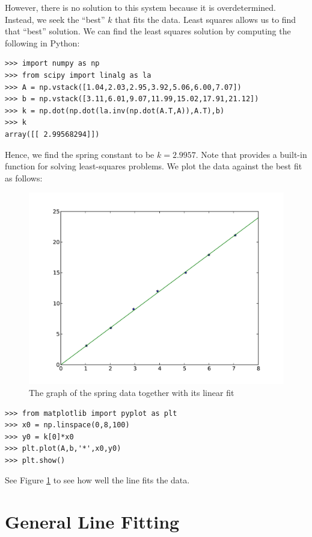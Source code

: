 However, there is no solution to this system because it is overdetermined.  
Instead, we seek the ``best'' $k$ that fits the data.  
Least squares allows us to find that ``best'' solution. 
We can find the least squares solution by computing the following in Python:
\begin{lstlisting}
>>> import numpy as np
>>> from scipy import linalg as la
>>> A = np.vstack([1.04,2.03,2.95,3.92,5.06,6.00,7.07])
>>> b = np.vstack([3.11,6.01,9.07,11.99,15.02,17.91,21.12])
>>> k = np.dot(np.dot(la.inv(np.dot(A.T,A)),A.T),b)
>>> k
array([[ 2.99568294]])
\end{lstlisting}
Hence, we find the spring constant to be $k = 2.9957$.
Note that  provides a built-in function for solving 
least-squares problems.
We plot the data against the best fit as follows:
\begin{figure}[h!]
\label{fig1}
\begin{center}
\includegraphics[width=\textwidth]{line_lstsq}
\caption{The graph of the spring data together with its linear fit}
\label{Fig:SpringFit}
\end{center}
\end{figure}

\begin{lstlisting}
>>> from matplotlib import pyplot as plt
>>> x0 = np.linspace(0,8,100)
>>> y0 = k[0]*x0
>>> plt.plot(A,b,'*',x0,y0)
>>> plt.show()
\end{lstlisting}
See Figure \ref{Fig:SpringFit} to see how well the line fits the data.


\section*{General Line Fitting}

